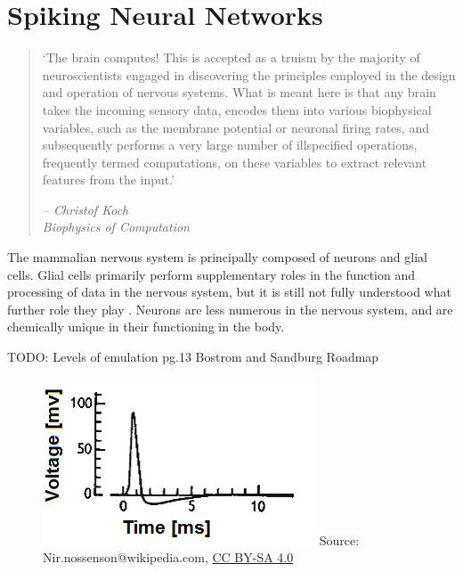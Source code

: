 \section{Spiking Neural Networks}

\begin{quote}
    `The brain computes! This is accepted as a truism by the majority
    of neuroscientists engaged in discovering the principles employed in the
    design and operation of nervous systems. What is meant here is that any
    brain takes the incoming sensory data, encodes them into various biophysical
    variables, such as the membrane potential or neuronal firing rates, and
    subsequently performs a very large number of illspecified operations,
    frequently termed computations, on these variables to extract relevant
    features from the input.'
    \begin{flushright}
        \textit{-- Christof Koch \\ Biophysics of Computation}
    \end{flushright}
\end{quote}

The mammalian nervous system is principally composed of neurons and glial cells.
Glial cells primarily perform supplementary roles in the function and processing
of data in the nervous system, but it is still not fully understood what further
role they play \autocite{walz_role_1989}. Neurons are less numerous in the
nervous system, and are chemically unique in their functioning in the body.

TODO: Levels of emulation pg.13 Bostrom and Sandburg Roadmap

\begin{figure}[h]
    \centering
    \includegraphics{figures/graphs/huxhog_spike.png}
    {\small{Source: Nir.nossenson@wikipedia.com,
            \href{https://creativecommons.org/licenses/by-sa/4.0/deed.en}{CC BY-SA 4.0}}}
    \label{neuronalactionpotentialexample}
\end{figure}
\vspace{1ex}

